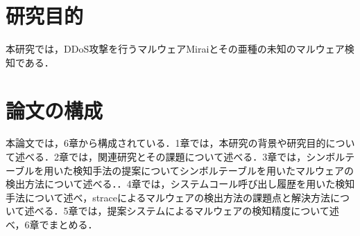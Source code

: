 \section{研究目的}
本研究では，DDoS攻撃を行うマルウェアMiraiとその亜種の未知のマルウェア検知である．

\section{論文の構成}
本論文では，6章から構成されている．1章では，本研究の背景や研究目的について述べる．2章では，関連研究とその課題について述べる．3章では，シンボルテーブルを用いた検知手法の提案についてシンボルテーブルを用いたマルウェアの検出方法について述べる．．4章では，システムコール呼び出し履歴を用いた検知手法について述べ，straceによるマルウェアの検出方法の課題点と解決方法について述べる．5章では，提案システムによるマルウェアの検知精度について述べ，6章でまとめる．